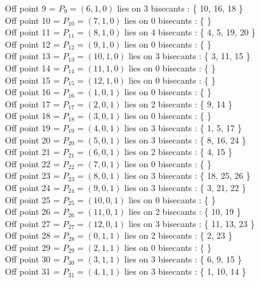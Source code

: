 \documentclass{article}
\begin{document}
{Off point 9 = $P_{9} = ( 6, 1, 0 )$ lies on 3 bisecants : \{ 10, 16, 18 \}\\
Off point 10 = $P_{10} = ( 7, 1, 0 )$ lies on 0 bisecants : \{  \}\\
Off point 11 = $P_{11} = ( 8, 1, 0 )$ lies on 4 bisecants : \{ 4, 5, 19, 20 \}\\
Off point 12 = $P_{12} = ( 9, 1, 0 )$ lies on 0 bisecants : \{  \}\\
Off point 13 = $P_{13} = ( 10, 1, 0 )$ lies on 3 bisecants : \{ 3, 11, 15 \}\\
Off point 14 = $P_{14} = ( 11, 1, 0 )$ lies on 0 bisecants : \{  \}\\
Off point 15 = $P_{15} = ( 12, 1, 0 )$ lies on 0 bisecants : \{  \}\\
Off point 16 = $P_{16} = ( 1, 0, 1 )$ lies on 0 bisecants : \{  \}\\
Off point 17 = $P_{17} = ( 2, 0, 1 )$ lies on 2 bisecants : \{ 9, 14 \}\\
Off point 18 = $P_{18} = ( 3, 0, 1 )$ lies on 0 bisecants : \{  \}\\
Off point 19 = $P_{19} = ( 4, 0, 1 )$ lies on 3 bisecants : \{ 1, 5, 17 \}\\
Off point 20 = $P_{20} = ( 5, 0, 1 )$ lies on 3 bisecants : \{ 8, 16, 24 \}\\
Off point 21 = $P_{21} = ( 6, 0, 1 )$ lies on 2 bisecants : \{ 4, 15 \}\\
Off point 22 = $P_{22} = ( 7, 0, 1 )$ lies on 0 bisecants : \{  \}\\
Off point 23 = $P_{23} = ( 8, 0, 1 )$ lies on 3 bisecants : \{ 18, 25, 26 \}\\
Off point 24 = $P_{24} = ( 9, 0, 1 )$ lies on 3 bisecants : \{ 3, 21, 22 \}\\
Off point 25 = $P_{25} = ( 10, 0, 1 )$ lies on 0 bisecants : \{  \}\\
Off point 26 = $P_{26} = ( 11, 0, 1 )$ lies on 2 bisecants : \{ 10, 19 \}\\
Off point 27 = $P_{27} = ( 12, 0, 1 )$ lies on 3 bisecants : \{ 11, 13, 23 \}\\
Off point 28 = $P_{28} = ( 0, 1, 1 )$ lies on 2 bisecants : \{ 2, 23 \}\\
Off point 29 = $P_{29} = ( 2, 1, 1 )$ lies on 0 bisecants : \{  \}\\
Off point 30 = $P_{30} = ( 3, 1, 1 )$ lies on 3 bisecants : \{ 6, 9, 15 \}\\
Off point 31 = $P_{31} = ( 4, 1, 1 )$ lies on 3 bisecants : \{ 1, 10, 14 \}\\
}
\end{document}
